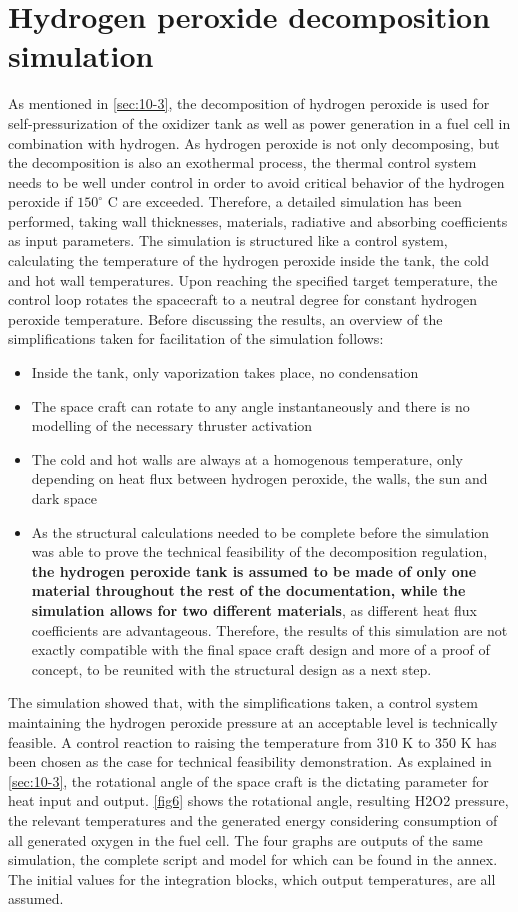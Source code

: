 \section{Hydrogen peroxide decomposition simulation}
\label{sec:11-3}
\qquad As mentioned in \autoref{sec:10-3}, the decomposition of hydrogen peroxide is used for self-pressurization of the oxidizer tank as well as power generation in a fuel cell in combination with hydrogen. As hydrogen peroxide is not only decomposing, but the decomposition is also an exothermal process, the thermal control system needs to be well under control in order to avoid critical behavior of the hydrogen peroxide if $150^\circ$ C are exceeded. Therefore, a detailed simulation has been performed, taking wall thicknesses, materials, radiative and absorbing coefficients as input parameters. The simulation is structured like a control system, calculating the temperature of the hydrogen peroxide inside the tank, the cold and hot wall temperatures. Upon reaching the specified target temperature, the control loop rotates the spacecraft to a neutral degree for constant hydrogen peroxide temperature. Before discussing the results, an overview of the simplifications taken for facilitation of the simulation follows:
\begin{itemize}
	\itemsep0em 
	\item	Inside the tank, only vaporization takes place, no condensation
	\item	The space craft can rotate to any angle instantaneously and there is no modelling of the necessary thruster activation
	\item	The cold and hot walls are always at a homogenous temperature, only depending on heat flux between hydrogen peroxide, the walls, the sun and dark space
	\item	As the structural calculations needed to be complete before the simulation was able to prove the technical feasibility of the decomposition regulation, \textbf{the hydrogen peroxide tank is assumed to be made of only one material throughout the rest of the documentation, while the simulation allows for two different materials}, as different heat flux coefficients are advantageous. Therefore, the results of this simulation are not exactly compatible with the final space craft design and more of a proof of concept, to be reunited with the structural design as a next step.
\end{itemize}

The simulation showed that, with the simplifications taken, a control system maintaining the hydrogen peroxide pressure at an acceptable level is technically feasible. A control reaction to raising the temperature from $310$ K to $350$ K has been chosen as the case for technical feasibility demonstration. As explained in \autoref{sec:10-3}, the rotational angle of the space craft is the dictating parameter for heat input and output. \autoref{fig6} shows the rotational angle, resulting H2O2 pressure, the relevant temperatures and the generated energy considering consumption of all generated oxygen in the fuel cell. The four graphs are outputs of the same simulation, the complete script and model for which can be found in the annex. The initial values for the integration blocks, which output temperatures, are all assumed.

